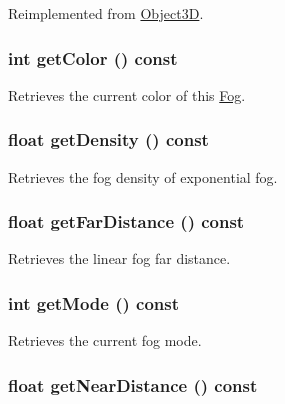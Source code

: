 Reimplemented from \hyperlink{classm3g_1_1Object3D_8aad1ceab4c2a03609c8a42324ce484d}{Object3D}.\hypertarget{classm3g_1_1Fog_4cfa1931c265ec3412fe3f6408a1b4f5}{
\subsubsection[{getColor}]{\setlength{\rightskip}{0pt plus 5cm}int getColor () const}}
\label{classm3g_1_1Fog_4cfa1931c265ec3412fe3f6408a1b4f5}


Retrieves the current color of this \hyperlink{classm3g_1_1Fog}{Fog}. \hypertarget{classm3g_1_1Fog_31deef556a6aa5e519d3c79bd9c383c0}{
\subsubsection[{getDensity}]{\setlength{\rightskip}{0pt plus 5cm}float getDensity () const}}
\label{classm3g_1_1Fog_31deef556a6aa5e519d3c79bd9c383c0}


Retrieves the fog density of exponential fog. \hypertarget{classm3g_1_1Fog_90df17252a921929fce6a5e92aed4021}{
\subsubsection[{getFarDistance}]{\setlength{\rightskip}{0pt plus 5cm}float getFarDistance () const}}
\label{classm3g_1_1Fog_90df17252a921929fce6a5e92aed4021}


Retrieves the linear fog far distance. \hypertarget{classm3g_1_1Fog_d4ce4524e4751fe5e3cfb8c270347d54}{
\subsubsection[{getMode}]{\setlength{\rightskip}{0pt plus 5cm}int getMode () const}}
\label{classm3g_1_1Fog_d4ce4524e4751fe5e3cfb8c270347d54}


Retrieves the current fog mode. \hypertarget{classm3g_1_1Fog_cd7a642e43bf99b0e1c5c24d3c6424a2}{
\subsubsection[{getNearDistance}]{\setlength{\rightskip}{0pt plus 5cm}float getNearDistance () const}}
\label{classm3g_1_1Fog_cd7a642e43bf99b0e1c5c24d3c6424a2}



